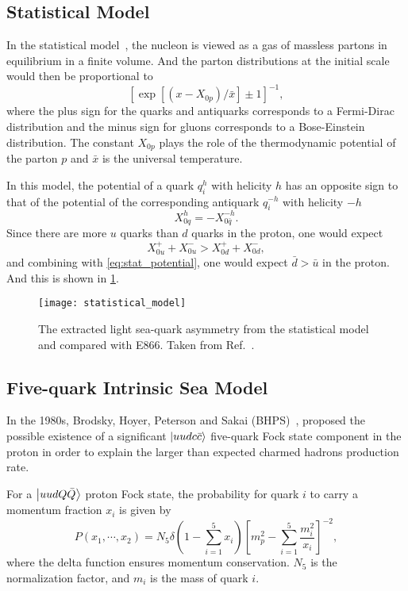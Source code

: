 \documentclass[../main.tex]{subfiles}
\begin{document}
\subsection{Statistical Model}
In the statistical model~\cite{bourrely2015}, the nucleon is viewed as a gas of massless partons in equilibrium in
a finite volume. And the parton distributions at the initial scale would then be proportional to
\begin{equation}
	\left[ \exp\left[\left(x-X_{0p}\right)/\bar{x}\right] \pm 1 \right]^{-1},
\end{equation}
where the plus sign for the quarks and antiquarks corresponds to a Fermi-Dirac distribution and
the minus sign for gluons corresponds to a Bose-Einstein distribution. The constant $X_{0p}$
plays the role of the thermodynamic potential of the parton $p$ and $\bar{x}$ is the universal
temperature.

In this model, the potential of a quark $q_i^h$ with helicity $h$ has an opposite sign to that of the
potential of the corresponding antiquark $q_i^{-h}$ with helicity $-h$
\begin{equation}
	X_{0q}^h = -X_{0\bar{q}}^{-h}.
	\label{eq:stat_potential}
\end{equation}
Since there are more $u$ quarks than $d$ quarks in the proton, one would expect
\begin{equation}
	X_{0u}^+ + X_{0u}^- > X_{0d}^+ + X_{0d}^-,
\end{equation}
and combining with \cref{eq:stat_potential}, one would expect $\bar{d} > \bar{u}$ in the proton.
And this is shown in \cref{fig:stat_dbub}.
\begin{figure}
	\centering
	\texttt{[image: statistical\_model]}
	\caption{The extracted light sea-quark asymmetry from the statistical model and compared with E866. Taken
		from Ref.~\cite{soffer2019}.}
	\label{fig:stat_dbub}
\end{figure}


\subsection{Five-quark Intrinsic Sea Model}
In the 1980s, Brodsky, Hoyer, Peterson and Sakai (BHPS)~\cite{brodsky1980}, proposed
the possible existence of a significant $\ket{uudc\bar{c}}$ five-quark Fock state component
in the proton in order to explain the larger than expected charmed hadrons production rate.

For a $\ket{uudQ\bar{Q}}$ proton Fock state, the probability for quark $i$ to carry a momentum
fraction $x_i$ is given by
\begin{equation}
	P\left(x_1,\cdots,x_2\right)=N_5 \delta\left(1-\sum^5_{i=1}x_i\right)\left[m_p^2-\sum^5_{i=1}\frac{m_i^2}{x_i}\right]^{-2},
\end{equation}
where the delta function ensures momentum conservation. $N_5$ is the normalization factor,
and $m_i$ is the mass of quark $i$.
\end{document}
